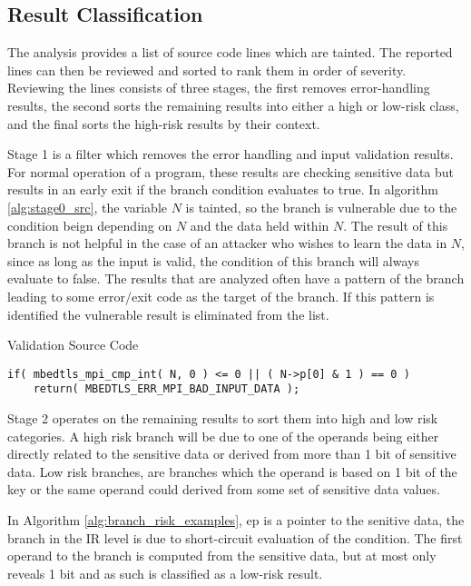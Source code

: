\documentclass[11pt,a4paper]{article}
\begin{document}
\subsection{Result Classification}

The analysis provides a list of source code lines which are tainted. The
reported lines can then be reviewed and sorted to rank them in order of
severity. Reviewing the lines consists of three stages, the first removes
error-handling results, the second sorts the remaining results into either a
high or low-risk class, and the final sorts the high-risk results by their
context.

Stage 1 is a filter which removes the error handling and input validation
results. For normal operation of a program, these results are checking sensitive
data but results in an early exit if the branch condition evaluates to true. In
algorithm \ref{alg:stage0_src}, the variable $N$ is tainted, so the branch is
vulnerable due to the condition beign depending on $N$ and the data held within
$N$. The result of this branch is not helpful in the case of an attacker who
wishes to learn the data in $N$, since as long as the input is valid, the
condition of this branch will always evaluate to false. The results that are
analyzed often have a pattern of the branch leading to some error/exit code as the
target of the branch. If this pattern is identified the vulnerable result is
eliminated from the list.

\begin{algorithm}
\caption{Validation Source Code}
\begin{lstlisting}
if( mbedtls_mpi_cmp_int( N, 0 ) <= 0 || ( N->p[0] & 1 ) == 0 )
    return( MBEDTLS_ERR_MPI_BAD_INPUT_DATA );
\end{lstlisting}
\label{alg:stage0_src}
\end{algorithm}

Stage 2 operates on the remaining results to sort them into high and low
risk categories. A high risk branch will be due to one of the operands being
either directly related to the sensitive data or derived from more than 1 bit of
sensitive data. Low risk branches, are branches which the operand is based on 1
bit of the key or the same operand could derived from some set of sensitive data
values.

In Algorithm \ref{alg:branch_risk_examples}, ep is a pointer to the senitive
data, the branch in the IR level is due to short-circuit evaluation of the
condition. The first operand to the branch is computed from the sensitive data,
but at most only reveals 1 bit and as such is classified as a low-risk result.
\end{document}
